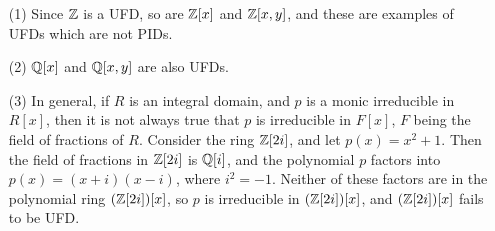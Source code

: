 \begin{example}\label{example_7.3}
  \begin{enumerate}
    \item[(1)] Since $\mathbb{Z}$ is a UFD, so are $\mathbb{Z}[x]$ and $\mathbb{Z}[x,y]$, and these
      are examples of UFDs which are not PIDs.

    \item[(2)] $\mathbb{Q}[x]$ and $\mathbb{Q}[x,y]$ are also UFDs.

    \item[(3)] In general, if $R$ is an integral domain, and  $p$ is a monic
      irreducible in  $R[x]$, then it is not always true that $p$ is
      irreducible in $F[x]$, $F$ being the field of fractions of  $R$.
      Consider the ring  $\mathbb{Z}[2i]$, and let $p(x)=x^2+1$. Then the field of
      fractions in $\mathbb{Z}[2i]$ is $\mathbb{Q}[i]$, and the polynomial $p$ factors
      into  $p(x)=(x+i)(x-i)$, where $i^2=-1$. Neither of these factors
      are in the polynomial ring  $(\mathbb{Z}[2i])[x]$, so $p$ is irreducible in
      $(\mathbb{Z}[2i])[x]$, and $(\mathbb{Z}[2i])[x]$ fails to be UFD.
  \end{enumerate}
\end{example}
